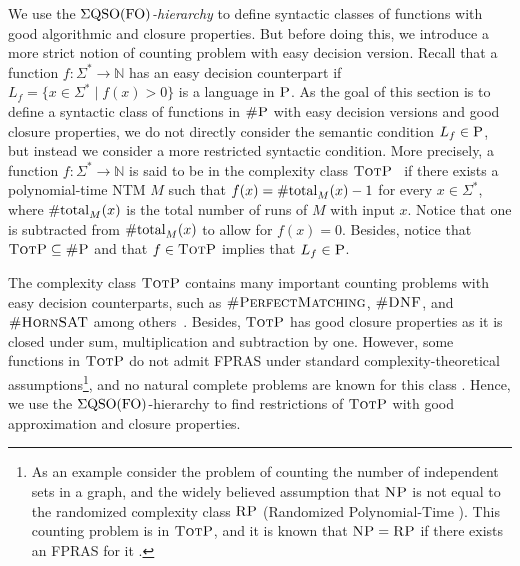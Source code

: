 
We use the \emph{$\Sigma{\rm QSO}({\rm FO})$-hierarchy} to define syntactic classes of functions with good algorithmic and closure properties.  
But before doing this, we introduce a more strict notion of counting problem with easy decision version.
Recall that a function $f : \Sigma^* \to \mathbb{N}$ has an easy decision counterpart if $L_f = \{ x \in \Sigma^* \mid f(x) > 0 \}$ is a language in $\text{\sc P}$. As the goal of this section is to define a syntactic class of functions in $\text{\sc \#P}$ with easy decision versions and good closure properties, we do not directly consider the semantic condition $L_f  \in \text{\sc P}$, but instead we consider a more restricted syntactic condition. More precisely, a function $f : \Sigma^* \to \mathbb{N}$ is said to be in the complexity class $\text{\sc TotP}$~\cite{PagourtzisZ06} if there exists a  polynomial-time NTM $M$ such that $f(x) = \text{\rm \#total}_M(x) - 1$ for every $x \in \Sigma^*$, where $\text{\rm \#total}_M(x)$ is the total number of runs of $M$ with input $x$. Notice that one is subtracted from $\text{\rm \#total}_M(x)$ to allow for $f(x) = 0$. Besides, notice that $\text{\sc TotP} \subseteq \text{\sc \#P}$ and that $f \in \text{\sc TotP}$ implies that $L_f \in \text{\sc P}$. 

The complexity class $\text{\sc TotP}$ contains many important counting problems with easy decision counterparts, such as $\textsc{\#PerfectMatching}$, $\textsc{\#DNF}$, and $\textsc{\#HornSAT}$ among others~\cite{PagourtzisZ06}. Besides, $\text{\sc TotP}$ has good closure properties as it is closed under sum, multiplication and subtraction by one. However, some functions in $\text{\sc TotP}$ do not admit FPRAS under standard complexity-theoretical assumptions\footnote{As an example consider the problem of counting the number of independent sets in a graph, and the widely believed assumption that $\text{\sc NP}$ is not equal to the randomized complexity class $\text{\sc RP}$ (Randomized Polynomial-Time \cite{G77}). This counting problem is in $\text{\sc TotP}$, and it is known that $\text{\sc NP} = \text{\sc RP}$ if there exists an FPRAS for it \cite{DFJ02}.}, and no natural complete problems are known for this class \cite{PagourtzisZ06}. Hence, we use the $\Sigma{\rm QSO}({\rm FO})$-hierarchy to find restrictions of $\text{\sc TotP}$ with good approximation and closure properties.

